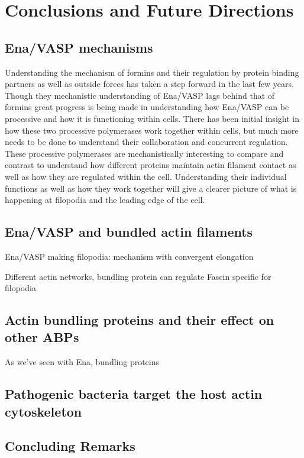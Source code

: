 \chapter{Conclusions and Future Directions}\label{ch:conclusions}

\section{Ena/VASP mechanisms}\label{ena-mechanism-conclusions}
Understanding the mechanism of formins and their regulation by protein binding partners as well as outside forces has taken a step forward in the last few years. Though they mechanistic understanding of Ena/VASP lags behind that of formins great progress is being made in understanding how Ena/VASP can be processive and how it is functioning within cells. There has been initial insight in how these two processive polymerases work together within cells, but much more needs to be done to understand their collaboration and concurrent regulation. These processive polymerases are mechanistically interesting to compare and contrast to understand how different proteins maintain actin filament contact as well as how they are regulated within the cell. Understanding their individual functions as well as how they work together will give a clearer picture of what is happening at filopodia and the leading edge of the cell. 

\section{Ena/VASP and bundled actin filaments}\label{ena-bundles-conclusions}
Ena/VASP making filopodia:
mechanism with convergent elongation

Different actin networks, bundling protein can regulate
Fascin specific for filopodia

\section{Actin bundling proteins and their effect on other ABPs}\label{bundler-conclusions}

As we've seen with Ena, bundling proteins 

\section{Pathogenic bacteria target the host actin cytoskeleton}\label{bacteria-conclusions}

\section{Concluding Remarks}\label{final-conclusions}